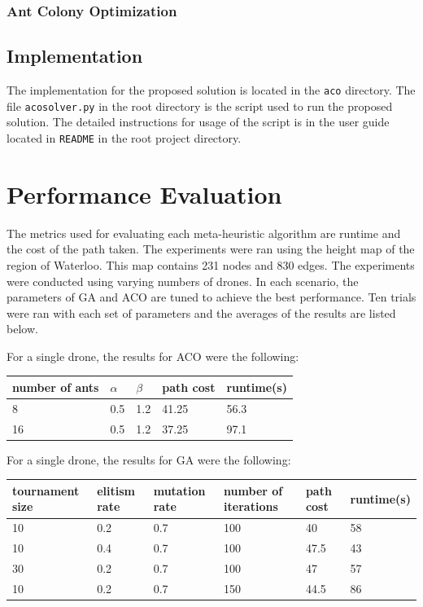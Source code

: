 \documentclass[conference]{IEEEtran}
\begin{document}
\subsubsection{Ant Colony Optimization}

\subsection{Implementation}
The implementation for the proposed solution is located in the \verb|aco| directory. The file \verb|acosolver.py| in the root directory is the script used to run the proposed solution. The detailed instructions for usage of the script is in the user guide located in \verb|README| in the root project directory. 

\section{Performance Evaluation}
The metrics used for evaluating each meta-heuristic algorithm are runtime and the cost of the path taken. The experiments were ran using the height map of the region of Waterloo. This map contains 231 nodes and 830 edges. The experiments were conducted using varying numbers of drones. In each scenario, the parameters of GA and ACO are tuned to achieve the best performance. Ten trials were ran with each set of parameters and the averages of the results are listed below.

For a single drone, the results for ACO were the following:
\begin{center}
\begin{tabular}{ | m{1cm} | m{1cm}| m{1cm} | m{1.5cm} | m{1.5cm} |} 
\hline
number of ants & $\alpha$ & $\beta$ & path cost & runtime(s) \\ 
\hline
8 & 0.5 & 1.2 & 41.25 & 56.3 \\
\hline
16 & 0.5 & 1.2 & 37.25 & 97.1 \\ 
\hline
\end{tabular}
\end{center}

For a single drone, the results for GA were the following:
\begin{center}
\begin{tabular}{ | m{1.5cm} | m{1cm}| m{1cm} | m{1.5cm} | m{1.5cm} | m{1.5cm} |} 
\hline
tournament size & elitism rate & mutation rate & number of iterations & path cost & runtime(s) \\ 
\hline
10 & 0.2 & 0.7 & 100 & 40 & 58 \\ 
\hline
10 & 0.4 & 0.7 & 100 & 47.5 &  43  \\ 
\hline
30 & 0.2 & 0.7 & 100 & 47 &  57  \\ 
\hline
10 & 0.2 & 0.7 & 150 & 44.5 &  86  \\ 
\hline
\end{tabular}
\end{center}
\end{document}
